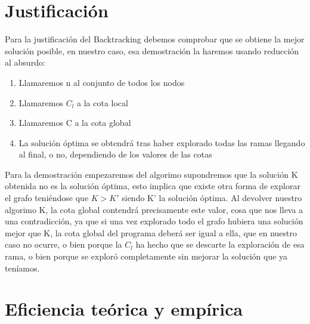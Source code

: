 \documentclass[11pt,openany]{book}
\begin{document}
\section{Justificación}
Para la justificación del Backtracking debemos comprobar que se obtiene la mejor solución posible, en nuestro caso, esa demostración la haremos usando reducción al absurdo:
\begin{enumerate}
    \item Llamaremos n al conjunto de todos los nodos
    \item Llamaremos $C_l$ a la cota local 
    \item Llamaremos C a la cota global
    \item La solución óptima se obtendrá tras haber explorado todas las ramas llegando al final, o no, dependiendo de los valores de las cotas
\end{enumerate}
Para la demostración empezaremos del algorimo supondremos que la solución K obtenida no es la solución óptima, esto implica que existe otra forma de explorar el grafo teniéndose que $K>K'$ siendo K' la solución óptima.
Al devolver nuestro algorimo K, la cota global contendrá precisamente este valor, cosa que nos lleva a una contradicción, ya que si una vez explorado todo el grafo hubiera una solución mejor que K, la cota global del programa deberá ser igual 
a ella, que en nuestro caso no ocurre, o bien porque la $C_l$ ha hecho que se descarte la exploración de esa rama, o bien porque se exploró completamente sin mejorar la solución que ya teníamos.

\section{Eficiencia teórica y empírica}
\end{document}
